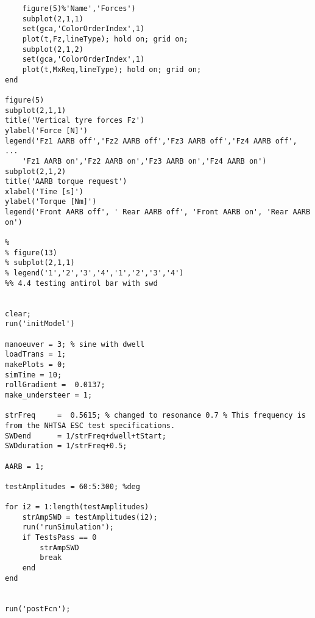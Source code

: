 \begin{lstlisting}
    figure(5)%'Name','Forces')
    subplot(2,1,1)
    set(gca,'ColorOrderIndex',1)
    plot(t,Fz,lineType); hold on; grid on;
    subplot(2,1,2)
    set(gca,'ColorOrderIndex',1)
    plot(t,MxReq,lineType); hold on; grid on;
end

figure(5)
subplot(2,1,1)
title('Vertical tyre forces Fz')
ylabel('Force [N]')
legend('Fz1 AARB off','Fz2 AARB off','Fz3 AARB off','Fz4 AARB off', ...
    'Fz1 AARB on','Fz2 AARB on','Fz3 AARB on','Fz4 AARB on')
subplot(2,1,2)
title('AARB torque request')
xlabel('Time [s]')
ylabel('Torque [Nm]')
legend('Front AARB off', ' Rear AARB off', 'Front AARB on', 'Rear AARB on')

% 
% figure(13)
% subplot(2,1,1)
% legend('1','2','3','4','1','2','3','4')
%% 4.4 testing antirol bar with swd


clear;
run('initModel')

manoeuver = 3; % sine with dwell 
loadTrans = 1;
makePlots = 0;
simTime = 10;
rollGradient =  0.0137;
make_understeer = 1;

strFreq     =  0.5615; % changed to resonance 0.7 % This frequency is from the NHTSA ESC test specifications. 
SWDend      = 1/strFreq+dwell+tStart;
SWDduration = 1/strFreq+0.5;

AARB = 1;

testAmplitudes = 60:5:300; %deg

for i2 = 1:length(testAmplitudes)
    strAmpSWD = testAmplitudes(i2);
    run('runSimulation');
    if TestsPass == 0
        strAmpSWD
        break
    end
end


run('postFcn');
\end{lstlisting}